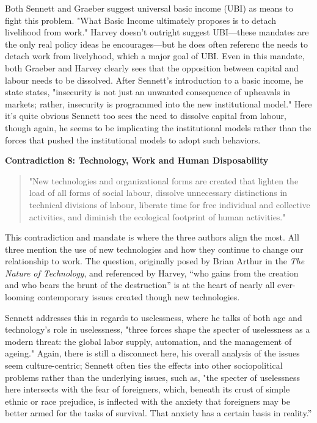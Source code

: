 \documentclass[12pt,a4paper]{article}
\begin{document}
Both Sennett and Graeber suggest universal basic income (UBI) as means to fight this problem. "What Basic Income ultimately proposes is to detach livelihood from work." \cite{bs}  Harvey doesn't outright suggest UBI---these mandates are the only real policy ideas he encourages---but he does often referenc the needs to detach work from livelyhood, which a major goal of UBI. Even in this mandate, both Graeber and Harvey clearly sees that the opposition between capital and labour needs to be dissolved. After Sennett's introduction to a basic income, he state states, "insecurity is not just an unwanted consequence of upheavals in markets; rather, insecurity is programmed into the new institutional model." \cite{new} Here it's quite obvious Sennett too sees the need to dissolve capital from labour, though again, he seems to be implicating the institutional models rather than the forces that pushed the institutional models to adopt such behaviors.

\textbf{Contradiction 8: Technology, Work and Human Disposability}
\begin{quotation} {\color{G-Moon}
    \noindent "New technologies and organizational forms are created that lighten the load of all forms of social labour, dissolve unnecessary distinctions in technical divisions of labour, liberate time for free individual and collective activities, and diminish the ecological footprint of human activities." \cite{con}}
\end{quotation}

This contradiction and mandate is where the three authors align the most. All three mention the use of new technologies and how they continue to change our relationship to work. The question, originally posed by Brian Arthur in the \textit{The Nature of Technology}, and  referenced by Harvey, “who gains from the creation and who bears the brunt of the destruction” \cite{nature} is at the heart of nearly all ever-looming contemporary issues created though new technologies. 
\vspace*{10pt}

Sennett addresses this in regards to uselessness, where he talks of both age and technology's role in uselessness, "three forces shape the specter of uselessness as a modern threat: the global labor supply, automation, and the management of ageing." \cite{new} Again, there is still a disconnect here, his overall analysis of the issues seem culture-centric; Sennett often ties the effects into other sociopolitical problems rather than the underlying issues, such as, "the specter of uselessness here intersects with the fear of foreigners, which, beneath its crust of simple ethnic or race prejudice, is inflected with the anxiety that foreigners may be better armed for the tasks of survival. That anxiety has a certain basis in reality.” \cite{new} 
\vspace*{10pt}
\end{document}
